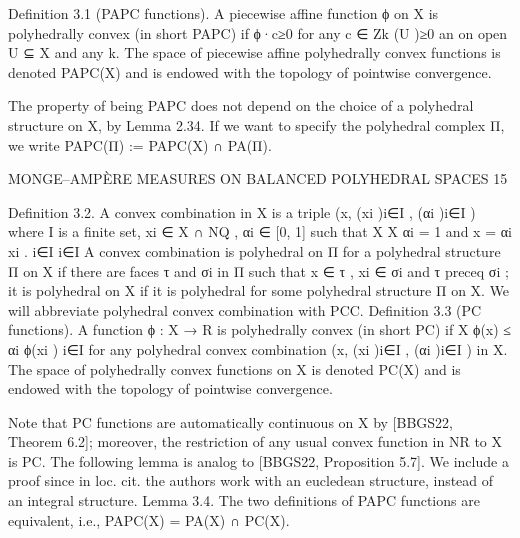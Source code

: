 \documentclass[
  11pt,
]{article}
\newenvironment{Shaded}{}{}
\newcommand{\NormalTok}[1]{#1}
\begin{document}
\begin{Shaded}
\begin{Highlighting}[]
\NormalTok{Definition 3.1 (PAPC functions). A piecewise affine function ϕ on X is polyhedrally convex}
\NormalTok{(in short PAPC) if}
\NormalTok{                                      ϕ·c≥0}
\NormalTok{for any c ∈ Zk (U )≥0 an on open U ⊆ X and any k. The space of piecewise affine polyhedrally}
\NormalTok{convex functions is denoted PAPC(X) and is endowed with the topology of pointwise convergence.}

\NormalTok{  The property of being PAPC does not depend on the choice of a polyhedral structure on X, by}
\NormalTok{Lemma 2.34. If we want to specify the polyhedral complex Π, we write}
\NormalTok{                                          PAPC(Π) := PAPC(X) ∩ PA(Π).}

\NormalTok{                   MONGE–AMPÈRE MEASURES ON BALANCED POLYHEDRAL SPACES                                      15}


\NormalTok{Definition 3.2. A convex combination in X is a triple}
\NormalTok{                                               (x, (xi )i∈I , (αi )i∈I )}
\NormalTok{where I is a finite set, xi ∈ X ∩ NQ , αi ∈ [0, 1] such that}
\NormalTok{                                   X                       X}
\NormalTok{                                       αi = 1 and x =        αi xi .}
\NormalTok{                                        i∈I                          i∈I}
\NormalTok{A convex combination is polyhedral on Π for a polyhedral structure Π on X if there are faces τ}
\NormalTok{and σi in Π such that x ∈ τ , xi ∈ σi and τ preceq σi ; it is polyhedral on X if it is polyhedral for some}
\NormalTok{polyhedral structure Π on X. We will abbreviate polyhedral convex combination with PCC.}
\NormalTok{Definition 3.3 (PC functions). A function ϕ : X → R is polyhedrally convex (in short PC) if}
\NormalTok{                                          X}
\NormalTok{                                   ϕ(x) ≤      αi ϕ(xi )}
\NormalTok{                                                           i∈I}
\NormalTok{for any polyhedral convex combination (x, (xi )i∈I , (αi )i∈I ) in X. The space of polyhedrally convex}
\NormalTok{functions on X is denoted PC(X) and is endowed with the topology of pointwise convergence.}

\NormalTok{   Note that PC functions are automatically continuous on X by [BBGS22, Theorem 6.2]; moreover,}
\NormalTok{the restriction of any usual convex function in NR to X is PC. The following lemma is analog to}
\NormalTok{[BBGS22, Proposition 5.7]. We include a proof since in loc. cit. the authors work with an eucledean}
\NormalTok{structure, instead of an integral structure.}
\NormalTok{Lemma 3.4. The two definitions of PAPC functions are equivalent, i.e.,}
\NormalTok{                                        PAPC(X) = PA(X) ∩ PC(X).}


\end{Highlighting}
\end{Shaded}
\end{document}
